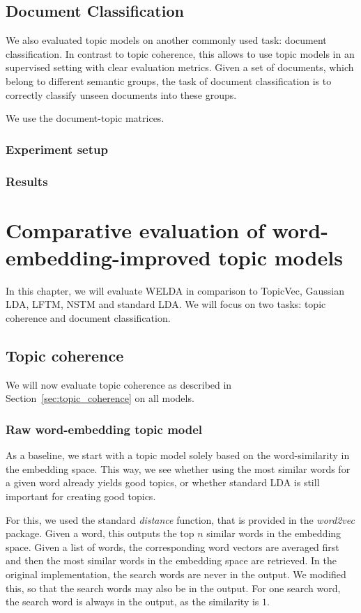 \documentclass[
        a4paper,
        titlepage,
        twoside,
        parskip
        ]{scrbook}
\theoremstyle{break}
\begin{document}
\section{Document Classification}
We also evaluated topic models on another commonly used task: document classification.
In contrast to topic coherence, this allows to use topic models in an supervised setting with clear evaluation metrics.
Given a set of documents, which belong to different semantic groups, the task of document classification is to correctly classify unseen documents into these groups.

We use the document-topic matrices.

\subsection{Experiment setup}
\subsection{Results}


\chapter{Comparative evaluation of word-embedding-improved topic models}

In this chapter, we will evaluate WELDA in comparison to TopicVec, Gaussian LDA, LFTM, NSTM and standard LDA.
We will focus on two tasks: topic coherence and document classification.

\section{Topic coherence}
\label{sec:evaluation_topic_coherence}

We will now evaluate topic coherence as described in Section~\ref{sec:topic_coherence} on all models.

\subsection{Raw word-embedding topic model}
As a baseline, we start with a topic model solely based on the word-similarity in the embedding space.
This way, we see whether using the most similar words for a given word already yields good topics, or whether standard LDA is still important for creating good topics.

For this, we used the standard \emph{distance} function, that is provided in the \emph{word2vec} package.
Given a word, this outputs the top $n$ similar words in the embedding space.
Given a list of words, the corresponding word vectors are averaged first and then the most similar words in the embedding space are retrieved.
In the original implementation, the search words are never in the output.
We modified this, so that the search words may also be in the output.
For one search word, the search word is always in the output, as the similarity is $1$.
\end{document}

